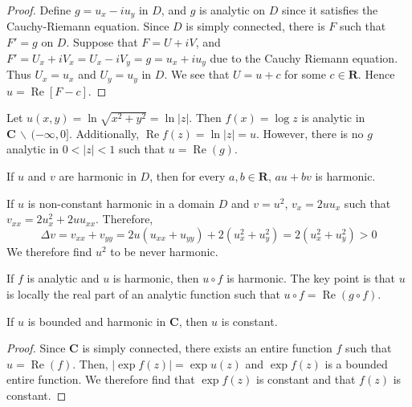 \begin{proof}
Define $g=u_{x}-iu_{y}$ in $D$, and $g$ is analytic on $D$ since it satisfies the Cauchy-Riemann equation. Since $D$ is simply connected, there is $F$ such that $F'=g$ on $D$. Suppose that $F=U+iV$, and $F'=U_{x}+iV_{x}=U_{x}-iV_{y}=g=u_{x}+iu_{y}$ due to the Cauchy Riemann equation. Thus $U_{x}=u_{x}$ and $U_{y}=u_{y}$ in $D$. We see that $U=u+c$ for some $c\in {\bm R}$. Hence $u=\mathop{\mathrm{Re}}[F-c]$.
\end{proof}
\vspace{2ex}
\begin{ex}
Let $u(x,y)=\ln \sqrt{x^2+y^2}=\ln |z|$. Then $f(x)=\log z$ is analytic in ${\bm C}\,\backslash\,(-\infty ,0]$. Additionally, $\mathop{\mathrm{Re}}f(z)=\ln |z|=u$. However, there is no $g$ analytic in $0<|z|<1$ such that $u=\mathop{\mathrm{Re}}(g)$. 
\end{ex}
\vspace{2ex}
\begin{rmk}
If $u$ and $v$ are harmonic in $D$, then for every $a,b\in {\bm R}$, $au+bv$ is harmonic.
\end{rmk}
\vspace{2ex}
\begin{ex}
If $u$ is non-constant harmonic in a domain $D$ and $v=u^2$, $v_{x}=2uu_{x}$ such that $v_{xx}=2u_{x}^2+2uu_{xx}$. Therefore, 
\[\Delta v=v_{xx}+v_{yy}=2u(u_{xx}+u_{yy})+2(u_{x}^2+u_{y}^2)=2(u_{x}^2+u_{y}^2)>0\]
We therefore find $u^2$ to be never harmonic.
\end{ex}
\vspace{2ex}
\begin{rmk}
If $f$ is analytic and $u$ is harmonic, then $u\circ f$ is harmonic. The key point is that $u$ is locally the real part of an analytic function such that $u\circ f=\mathop{\mathrm{Re}}(g\circ f)$. 
\end{rmk}
\vspace{2ex}
\begin{thm}
If $u$ is bounded and harmonic in ${\bm C}$, then $u$ is constant. 
\end{thm}
\vspace{2ex}
\begin{proof}
Since ${\bm C}$ is simply connected, there exists an entire function $f$ such that $u=\mathop{\mathrm{Re}}(f)$. Then, $|\exp f(z)|=\exp u(z)$ and $\exp f(z)$ is a bounded entire function. We therefore find that $\exp f(z)$ is constant and that $f(z)$ is constant. 
\end{proof}
\vspace{2ex}
